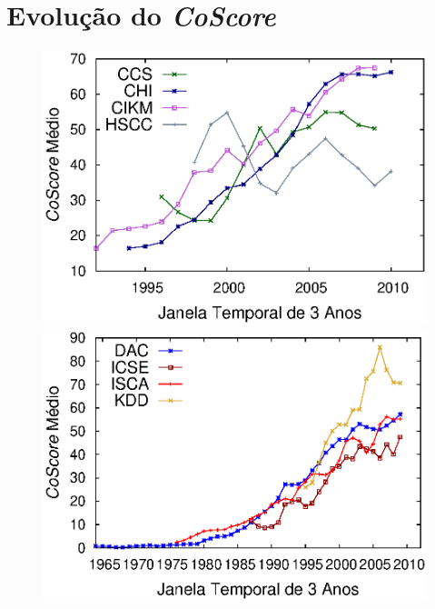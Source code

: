 \chapter{Evolução do \textit{CoScore}}\label{apendice:evolucao_pontuacao_nucleo}

\begin{figure}[!htb]
  \begin{center}
    \includegraphics[scale=.6]{../graficos/average_core_score/pt_BR/average_core_score_slide_window_grupo_3_temporal_web.eps}
    \includegraphics[scale=.6]{../graficos/average_core_score/pt_BR/average_core_score_slide_window_grupo_4_temporal_web.eps}
    \\

\end{center}
\end{figure}
